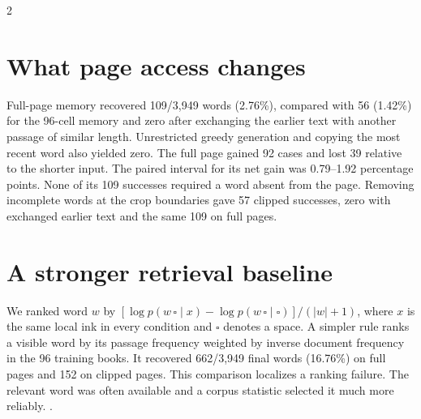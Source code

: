 \begin{multicols}{2}
\section*{What page access changes}
Full-page memory recovered 109/3,949 words (2.76\%), compared with 56 (1.42\%) for the 96-cell memory and zero after exchanging the earlier text with another passage of similar length. Unrestricted greedy generation and copying the most recent word also yielded zero. The full page gained 92 cases and lost 39 relative to the shorter input. The paired interval for its net gain was 0.79--1.92 percentage points. None of its 109 successes required a word absent from the page. Removing incomplete words at the crop boundaries gave 57 clipped successes, zero with exchanged earlier text and the same 109 on full pages.
\columnbreak
\section*{A stronger retrieval baseline}
We ranked word $w$ by $[\log p(w\,\square\mid x)-\log p(w\,\square\mid\square)]/(|w|+1)$, where $x$ is the same local ink in every condition and $\square$ denotes a space. A simpler rule ranks a visible word by its passage frequency weighted by inverse document frequency in the 96 training books. It recovered 662/3,949 final words (16.76\%) on full pages and 152 on clipped pages. This comparison localizes a ranking failure. The relevant word was often available and a corpus statistic selected it much more reliably. .
\end{multicols}
